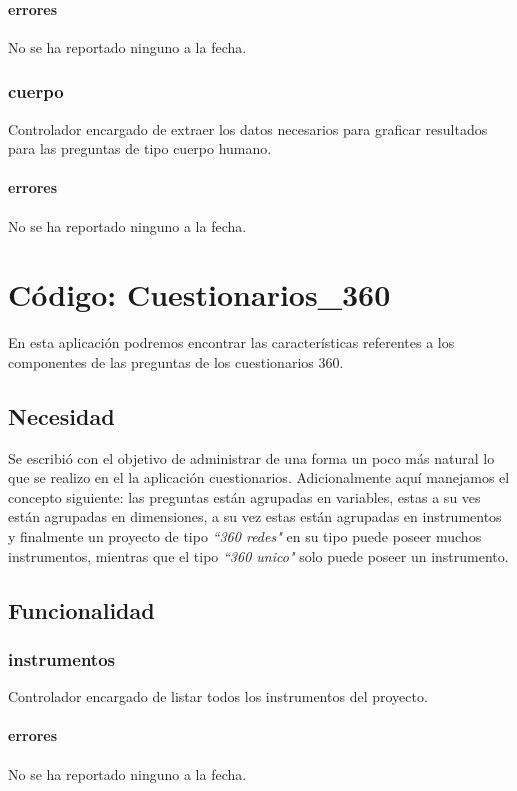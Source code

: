 \documentclass[10pt,a4paper]{book}
\begin{document}
	\subsubsection{errores}
	No se ha reportado ninguno a la fecha.

	\subsection{cuerpo}
	Controlador encargado de extraer los datos necesarios para graficar resultados para las preguntas de tipo cuerpo humano.
	\subsubsection{errores}
	No se ha reportado ninguno a la fecha.


	\chapter{Código: Cuestionarios\_360}

	En esta aplicación podremos encontrar las características referentes a los componentes de las preguntas de los cuestionarios 360.

	\section{Necesidad}

	Se escribió con el objetivo de administrar de una forma un poco más natural lo que se realizo en el la aplicación cuestionarios. Adicionalmente aquí manejamos el concepto siguiente: las preguntas están agrupadas en variables, estas a su ves están agrupadas en dimensiones, a su vez estas están agrupadas en instrumentos y finalmente un proyecto de tipo \textit{``360 redes"} en su tipo puede poseer muchos instrumentos, mientras que el tipo \textit{``360 unico"} solo puede poseer un instrumento.

	\section{Funcionalidad}

	\subsection{instrumentos}
	Controlador encargado de listar todos los instrumentos del proyecto.
	\subsubsection{errores}
	No se ha reportado ninguno a la fecha.
\end{document}
